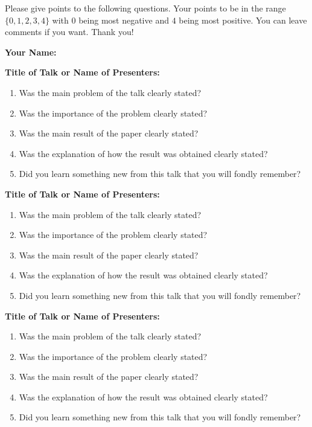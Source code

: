 \documentclass{article}
\begin{document}
	\thispagestyle{empty}
	\noindent
	Please give points to the following questions. Your points to be in the range $\{0,1,2,3,4\}$ with 
	$0$ being most negative and $4$ being most positive. You can leave comments if you want. Thank you! \medskip
	
\noindent	
{\bf Your Name:} \vspace{5ex}

\noindent 
{\bf Title of Talk or Name of Presenters:} \vspace{3ex}


\begin{enumerate}[itemsep=5pt]
	\item Was the main problem of the talk clearly stated?
	\item Was the importance of the problem clearly stated?
	\item Was the main result of the paper clearly stated?
	\item Was the explanation of how the result was obtained clearly stated?
	\item Did you learn something new from this talk that you will fondly remember?
\end{enumerate} 

\vspace{20ex}


\noindent 
{\bf Title of Talk or Name of Presenters:} \vspace{3ex}


\begin{enumerate}[itemsep=5pt]
	\item Was the main problem of the talk clearly stated?
	\item Was the importance of the problem clearly stated?
	\item Was the main result of the paper clearly stated?
	\item Was the explanation of how the result was obtained clearly stated?
	\item Did you learn something new from this talk that you will fondly remember?
\end{enumerate} 

\vspace{20ex}


\noindent 
{\bf Title of Talk or Name of Presenters:} \vspace{3ex}


\begin{enumerate}[itemsep=5pt]
	\item Was the main problem of the talk clearly stated?
	\item Was the importance of the problem clearly stated?
	\item Was the main result of the paper clearly stated?
	\item Was the explanation of how the result was obtained clearly stated?
	\item Did you learn something new from this talk that you will fondly remember?
\end{enumerate} 
\end{document}
